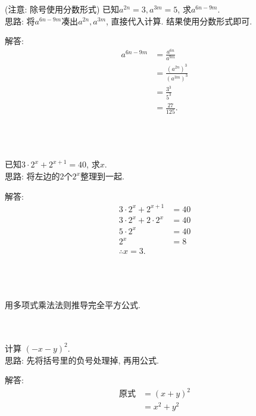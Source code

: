 \item{
    (注意: 除号使用分数形式) 已知$a^{2n}=3, a^{3m}=5$, 求$a^{6n-9m}$.
    \ifshowSolution
    \fangsong{}
    \\
    思路: 将$a^{6n-9m}$凑出$a^{2n}, a^{3m}$, 直接代入计算. 结果使用分数形式即可.

    解答: 
    \begin{align*}
        a^{6n-9m} &= \frac{a^{6n}}{a^{9m}}\\
        &= \frac{(a^{2n})^3} {(a^{3m})^3}\\
        &= \frac{3^3} {5^3}\\
        &= \frac{27} {125}.
    \end{align*}
    \fi
    \unless\ifshowSolution
    \\ \\ \\
    \fi
}

\item{
    已知$3\cdot2^x + 2^{x+1}=40$, 求$x$.
    \ifshowSolution
    \fangsong{}
    \\
    思路: 将左边的2个$2^{x}$整理到一起.

    解答: 
    \begin{align*}
        3\cdot2^x + 2^{x+1} &= 40\\
        3\cdot2^x + 2\cdot 2^{x} &= 40\\
        5\cdot2^x &= 40\\
        2^x &= 8\\
        \therefore x = 3.
    \end{align*}
    \fi
    \unless\ifshowSolution
    \\ \\ \\
    \fi
}

\item{
    用多项式乘法法则推导完全平方公式.
}
\\ \\ \\

\item{
    计算 $(-x-y)^2$.
    \ifshowSolution
    \fangsong{}
    \\
    思路: 先将括号里的负号处理掉, 再用公式.

    解答: 
    \begin{align*}
        \mbox{原式} &= (x+y)^2\\
        &= x^2 + y^2
    \end{align*}
    \fi
    \unless\ifshowSolution
    \\ \\ \\
    \fi
}

